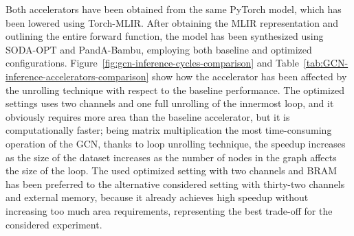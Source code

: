Both accelerators have been obtained from the same PyTorch model, which has been lowered using Torch-MLIR\@.
After obtaining the MLIR representation and outlining the entire forward function, the model has been synthesized using SODA-OPT and PandA-Bambu, employing both baseline and optimized configurations.
Figure~\ref{fig:gcn-inference-cycles-comparison} and Table~\ref{tab:GCN-inference-accelerators-comparison} show how the accelerator has been affected by the unrolling technique with respect to the baseline performance.
The optimized settings uses two channels and one full unrolling of the innermost loop, and it obviously requires more area than the baseline accelerator, but it is computationally faster; being matrix multiplication the most time-consuming operation of the GCN, thanks to loop unrolling technique, the speedup increases as the size of the dataset increases as the number of nodes in the graph affects the size of the loop.
The used optimized setting with two channels and BRAM has been preferred to the alternative considered setting with thirty-two channels and external memory, because it already achieves high speedup without increasing too much area requirements, representing the best trade-off for the considered experiment.

